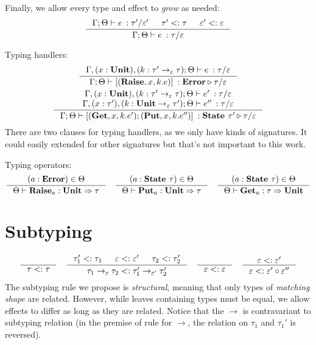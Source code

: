 \documentclass[declaration,shortabstract]{iithesis}
\theoremstyle{definition} \newtheorem{definition}{Definition}[section]
\newcommand{\types}[4][\Gamma;\Theta]{\ensuremath{{{#1} \vdash {#2} \: : {#3}/{#4}}}}
\newcommand{\arrow}[3]{{#1}\rightarrow_{#2}{#3}}
\newcommand{\optypes}[5][\Theta]{\ensuremath{{#1}\vdash{#2}_{#3} : {#4} \Rightarrow {#5}}}
\begin{document}
Finally, we allow every type and effect to \textit{grow} as needed:
$$
\inference{
    \types{e}{\tau'}{\varepsilon'} & \tau' <: \tau & \varepsilon' <: \varepsilon
}{
    \types{e}{\tau}{\varepsilon}
}
$$

Typing handlers:
\begin{gather*}
\begin{gathered}
\inference{
    \types[\Gamma,(x:\textbf{Unit}), (k:\arrow{\tau'}{\varepsilon}{\tau});\Theta]{e}{\tau}{\varepsilon}
}{ 
    \types{ [(\textbf{Raise}, x, k. e)]}{\textbf{Error}\triangleright \tau}{\varepsilon}
}
\\
\inference{
\types[\Gamma,(x:\textbf{Unit}), (k:\arrow{\tau'}{\varepsilon}{\tau});\Theta]{e'}{\tau}{\varepsilon} \\
\types[\Gamma,(x:\tau'),(k:\arrow{\textbf{Unit}}{\varepsilon}{\tau'});\Theta]{e''}{\tau}{\varepsilon} 
}{
\types{ [(\textbf{Get}, x, k. e');(\textbf{Put}, x, k. e'')]}{\textbf{State }\tau'\triangleright \tau}{\varepsilon} 
}
\end{gathered}
\end{gather*}
There are two clauses for typing handlers, as we only have kinds of signatures. It could easily extended for other signatures but that's not important to this work.

Typing operators:
\begin{gather*}
\begin{gathered}
\inference{
    (a : \textbf{Error}) \in \Theta
}{
    \optypes{\textbf{Raise}}{a}{\textbf{Unit}}{\tau}
}
\quad 
\inference{
    (a : \textbf{State }\tau) \in \Theta
}{
    \optypes{\textbf{Put}}{a}{\textbf{Unit}}{\tau}
}
\quad 
\inference{
    (a : \textbf{State }\tau) \in \Theta
}{
    \optypes{\textbf{Get}}{a}{\tau}{\textbf{Unit}}
}
\end{gathered}
\end{gather*}

\section{Subtyping}
\begin{gather*}
\begin{gathered}
\inference{}{\tau <: \tau}
\quad
\inference{
    \tau_1' <: \tau_1 & \varepsilon <: \varepsilon' & \tau_2 <: \tau_2'
}{
    \arrow{\tau_1}{\varepsilon}{\tau_2} <: \arrow{\tau_1'}{\varepsilon'}{\tau_2'}
} 
\quad
\inference{}{\varepsilon <: \varepsilon}
\quad
\inference{
    \varepsilon <: \varepsilon'
}{
    \varepsilon <: \varepsilon' \circ \varepsilon''
}
\end{gathered}
\end{gather*}
\setlength{\jot}{3pt}
The subtyping rule we propose is \textit{structural}, meaning that only types of
\textit{matching shape} are related.
However, while leaves containing types must be equal, we allow effects to differ as long as they are related.
Notice that the $\rightarrow$ is contravariant to subtyping relation
(in the premise of rule for $\rightarrow$, the relation on $\tau_1$ and $\tau_1'$ is reversed).
\end{document}
